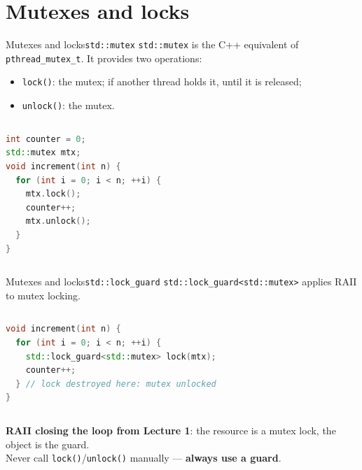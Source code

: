 
\section{Mutexes and locks}
\graphicspath{{figs/section4/}}

\begin{frame}[fragile]{Mutexes and locks}{\texttt{std::mutex}}
	\justifying
	\texttt{std::mutex} is the C++ equivalent of \texttt{pthread\_mutex\_t}. It provides two operations:
	\begin{itemize}
		\item \texttt{lock()}:  the mutex; if another thread holds it,  until it is released;
		\item \texttt{unlock()}:  the mutex.
	\end{itemize}
	\begin{columns}
		\begin{lstlisting}[style=codebeamer, language=C++, caption=Protecting a shared counter with \texttt{std::mutex}.]
int counter = 0;
std::mutex mtx;
void increment(int n) {
  for (int i = 0; i < n; ++i) {
    mtx.lock();
    counter++;
    mtx.unlock();
  }
}
    \end{lstlisting}
	\end{columns}
\end{frame}
\begin{frame}[fragile]{Mutexes and locks}{\texttt{std::lock\_guard}}
	\justifying
	\texttt{std::lock\_guard<std::mutex>} applies RAII to mutex locking.
	\begin{columns}
		\column{.9\textwidth}
		\begin{lstlisting}[style=codebeamer, language=C++, caption=RAII locking with \texttt{lock\_guard}.]
void increment(int n) {
  for (int i = 0; i < n; ++i) {
    std::lock_guard<std::mutex> lock(mtx);
    counter++;
  } // lock destroyed here: mutex unlocked
}
    \end{lstlisting}
	\end{columns}
	\begin{block}{}
		\centering
		\textbf{RAII closing the loop from Lecture 1}: the resource is a mutex lock, the object is the guard.\\
		Never call \texttt{lock()}/\texttt{unlock()} manually — \textbf{always use a guard}.
	\end{block}
\end{frame}
